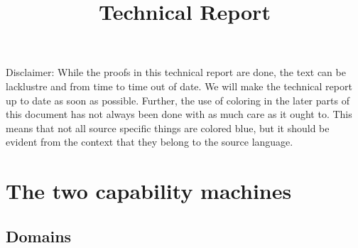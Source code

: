 \documentclass[a4paper]{article}
\title{Technical Report}
\begin{document}
\maketitle
\tableofcontents
Disclaimer: While the proofs in this technical report are done, the text can be lacklustre and from time to time out of date.
We will make the technical report up to date as soon as possible.
Further, the use of coloring in the later parts of this document has not always been done with as much care as it ought to. This means that not all source specific things are colored blue, but it should be evident from the context that they belong to the source language.

\section{The two capability machines}
\subsection{Domains}
\label{sec:domains}
\end{document}
